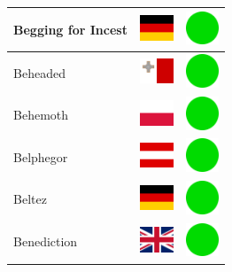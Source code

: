 \documentclass[12pt, a4paper, twoside]{report}
\begin{document}
\begin{center}
\begin{longtable}{|p{5cm}|p{2cm}|p{2cm}|}
 Begging for Incest                                         & \includegraphics[width=1cm]{../img/flags/de} &   \includegraphics[width=1cm]{../likes/y} \\ \hline
 Beheaded                                                   & \includegraphics[width=1cm]{../img/flags/mt} &   \includegraphics[width=1cm]{../likes/y} \\ \hline
 Behemoth                                                   & \includegraphics[width=1cm]{../img/flags/pl} &   \includegraphics[width=1cm]{../likes/y} \\ \hline
 Belphegor                                                  & \includegraphics[width=1cm]{../img/flags/at} &   \includegraphics[width=1cm]{../likes/y} \\ \hline
 Beltez                                                     & \includegraphics[width=1cm]{../img/flags/de} &   \includegraphics[width=1cm]{../likes/y} \\ \hline
 Benediction                                                & \includegraphics[width=1cm]{../img/flags/gb} &   \includegraphics[width=1cm]{../likes/y} \\ \hline

\end{longtable}
\end{center}
\end{document}
